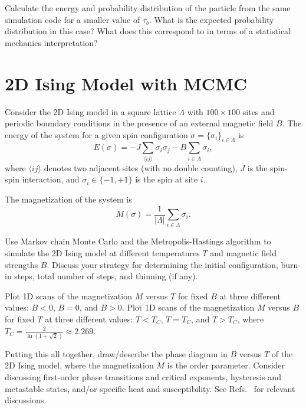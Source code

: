 \begin{problem}
Calculate the energy and probability distribution of the particle from the same simulation code for a smaller value of $\tau_b$.
What is the expected probability distribution in this case?
What does this correspond to in terms of a statistical mechanics interpretation?
\end{problem}


\newpage
\section{2D Ising Model with MCMC}

Consider the 2D Ising model in a square lattice $\Lambda$ with $100\times 100$ sites and periodic boundary conditions in the presence of an external magnetic field $B$.
The energy of the system for a given spin configuration $\sigma = \{\sigma_i\}_{i\in \Lambda}$ is
\begin{equation}
  E(\sigma) = -J\sum_{\langle ij\rangle} \sigma_i\sigma_j - B\sum_{i\in \Lambda} \sigma_i,
\end{equation}
where $\langle i j \rangle$ denotes two adjacent sites (with no double counting), $J$ is the spin-spin interaction, and $\sigma_i \in \{ -1, +1\}$ is the spin at site $i$.

The magnetization of the system is
\begin{equation}
  M(\sigma) = \frac{1}{|\Lambda|}\sum_{i\in \Lambda} \sigma_i.
\end{equation}

\begin{problem}
Use Markov chain Monte Carlo and the Metropolis-Hastings algorithm to simulate the 2D Ising model at different temperatures $T$ and magnetic field strengths $B$.
Discuss your strategy for determining the initial configuration, burn-in steps, total number of steps, and thinning (if any).
\end{problem}


\begin{problem}
Plot 1D scans of the magnetization $M$ versus $T$ for fixed $B$ at three different values: $B<0$, $B=0$, and $B>0$.
Plot 1D scans of the magnetization $M$ versus $B$ for fixed $T$ at three different values: $T<T_C$, $T=T_C$, and $T>T_C$, where $T_C=\frac{2}{\ln(1+\sqrt{2})}\approx 2.269$.
\end{problem}

\begin{problem}
Putting this all together, draw/describe the phase diagram in $B$ versus $T$ of the 2D Ising model, where the magnetization $M$ is the order parameter.
Consider discussing first-order phase transitions and critical exponents, hysteresis and metastable states, and/or specific heat and susceptibility.
See Refs.~\cite{Eastman:2014,Krauss:2018} for relevant discussions.
\end{problem}

